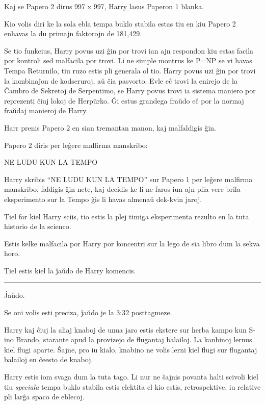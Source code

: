 Kaj se Papero 2 dirus 997 x 997, Harry lasus Paperon 1 blanka.

Kio volis diri ke la sola ebla tempa buklo stabila estas tiu en kiu
Papero 2 enhavas la du primajn faktorojn de 181,429.

Se tio funkcius, Harry povus uzi ĝin por trovi ian ajn respondon kiu
estas facila por kontroli sed malfacila por trovi. Li ne simple
montrus ke P=NP se vi havas Tempa Returnilo, tiu ruzo estis pli
generala ol tio. Harry povus uzi ĝin por trovi la kombinaĵon de
kodseruroj, aŭ ĉia pasvorto. Evle eĉ trovi la enirejo de la Ĉambro de
Sekretoj de Serpentimo, se Harry povus trovi ia sistema maniero por
reprezenti ĉiuj lokoj de Herpŭrko. Ĝi estus grandega fraŭdo eĉ por la
normaj fraŭdaj manieroj de Harry.

Harr prenis Papero 2 en sian tremantan manon, kaj malfaldigis ĝin.

Papero 2 diris per leĝere malfirma manskribo:

\medskip
\begin{center}
  NE LUDU KUN LA TEMPO
\end{center}

Harry skribis ``NE LUDU KUN LA TEMPO'' sur Papero 1 per leĝere
malfirma manskribo, faldigis ĝin nete, kaj decidis ke li ne faros iun
ajn plia vere brila eksperimento sur la Tempo ĝis li havas almenaŭ
dek-kvin jaroj. 


Tiel for kiel Harry sciis, tio estis la plej timiga eksperimenta
rezulto en la tuta historio de la scienco.

Estis kelke malfacila por Harry por koncentri sur la lego de sia libro
dum la sekva horo.

Tiel estis kiel la ĵaŭdo de Harry komencis.

\begin{center}\rule{3in}{0.4pt}\end{center}

Ĵaŭdo.

Se oni volis esti preciza, ĵaŭdo je la 3:32 posttagmeze.

Harry kaj ĉiuj la aliaj knaboj de unua jaro estis ekstere sur herba
kampo kun S-ino Brando, starante apud la provizejo de flugantaj
balailoj. La kanbinoj lernus kiel flugi aparte. Ŝajne, pro iu kialo,
knabino ne volis lerni kiel flugi sur flugantaj balailoj en ĉeesto de
knaboj.

Harry estis iom svaga dum la tuta tago. Li nur ne ŝajnis povanta halti
scivoli kiel tiu \emph{speciala} tempa buklo stabila estis elektita el
kio estis, retrospektive, iu relative pli larĝa spaco de eblecoj.

